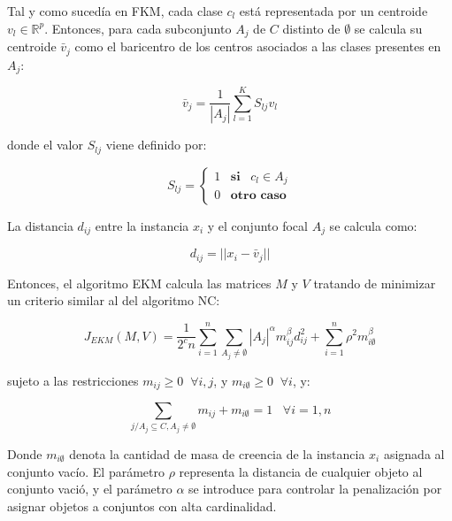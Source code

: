 Tal y como sucedía en \acf{FKM}, cada clase $c_l$ está representada por un centroide $v_l \in \mathbb{R}^p$. Entonces, para cada subconjunto $A_j$ de $C$ distinto de $\emptyset$ se calcula su centroide $\bar{v}_j$ como el baricentro de los centros asociados a las clases presentes en $A_j$:

\begin{equation}
\bar{v}_j = \frac{1}{|A_j|} \sum_{l=1}^{K} S_{lj} v_l
\label{eqn11}
\end{equation}

donde el valor $S_{lj}$ viene definido por:

\begin{equation}
S_{lj} = \begin{cases}
1 \;\;\; \textbf{si} \;\;\; c_l \in A_j\\
0 \;\;\; \textbf{otro caso}
\end{cases}
\label{eqn12}
\end{equation}

La distancia $d_{ij}$ entre la instancia $x_i$ y el conjunto focal $A_j$ se calcula como:

\begin{equation}
d_{ij} = ||x_i - \bar{v}_j||
\label{eqn13}
\end{equation}

Entonces, el algoritmo \acs{EKM} calcula las matrices $M$ y $V$ tratando de minimizar un criterio similar al del algoritmo \acs{NC}:

\begin{equation}
J_{EKM}(M,V) = \frac{1}{2^cn} \sum_{i=1}^{n}\sum_{A_j \neq \emptyset} |A_j|^\alpha m_{ij}^\beta d_{ij}^2 + \sum_{i=1}^{n} \rho^2 m_{i\emptyset}^\beta
\label{eqn14}
\end{equation}

sujeto a las restricciones $m_{ij} \ge 0 \;\; \forall i,j$, y $m_{i\emptyset} \ge 0 \;\; \forall i$, y:

\begin{equation}
\sum_{j/A_j \subseteq C, A_j \neq \emptyset} m_{ij} + m_{i\emptyset} = 1 \;\;\; \forall i = 1,n
\label{eqn15}
\end{equation}

Donde $m_{i\emptyset}$ denota la cantidad de masa de creencia de la instancia $x_i$ asignada al conjunto vacío. El parámetro $\rho$ representa la distancia de cualquier objeto al conjunto vació, y el parámetro $\alpha$ se introduce para controlar la penalización por asignar objetos a conjuntos con alta cardinalidad.

